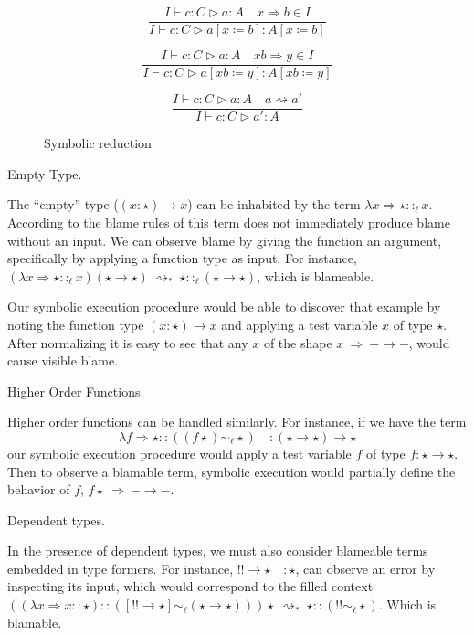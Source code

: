 \begin{figure}
\[
\frac{I\vdash  c:C\vartriangleright a:A\quad x\Rightarrow b\in I}{I\vdash  c:C\vartriangleright a\left[x\coloneqq b\right]:A\left[x\coloneqq b\right]}
\]

\[
\frac{I\vdash  c:C\vartriangleright a:A\quad xb\Rightarrow y\in I}{I\vdash  c:C\vartriangleright a\left[xb\coloneqq y\right]:A\left[xb\coloneqq y\right]}
\]

\[
\frac{I\vdash  c:C\vartriangleright a:A\quad a\rightsquigarrow a'}{I\vdash  c:C\vartriangleright a':A}
\]
\caption{Symbolic reduction}
\label{fig:sym-env-Sym-red}
\end{figure}
 
 
\begin{example} Empty Type.

The ``empty'' type ($\left(x:\star\right)\rightarrow x$) can be inhabited by the \clang{} term $\lambda x\Rightarrow\star::_{\ell }x$.
According to the blame rules of  this term does not immediately produce blame without an input.
We can observe blame by giving the function an argument, specifically by applying a function type as input.
For instance, $(\lambda x\Rightarrow\star::_{\ell }x)(\star\rightarrow\star)\ \rightsquigarrow_{*}\ \star::_{\ell }(\star\rightarrow\star)$, which is blameable.

Our symbolic execution procedure would be able to discover that example by noting the function type $\left(x:\star\right)\rightarrow x$ and applying a test variable $x$ of type $\star$.
After normalizing it is easy to see that any $x$ of the shape $x\ \Rightarrow\ -\rightarrow-$, would cause visible blame.
\end{example}

\begin{example} Higher Order Functions.

Higher order functions can be handled similarly.
For instance, if we have the \clang{} term
\[
\lambda f\Rightarrow\star::((f\star) \sim_{\ell}\star) \quad : \left(\star\rightarrow\star\right)\rightarrow\star
\]
  our symbolic execution procedure would apply a test variable $f$ of type $f:\star\rightarrow\star$.
Then to observe a blamable term, symbolic execution would partially define the behavior of $f$, $f\star\ \Rightarrow\ -\rightarrow-$.
\end{example}

\begin{example} Dependent types.

In the presence of dependent types, we must also consider blameable terms embedded in type formers.
For instance, $!!\rightarrow\star\quad:\star$, can observe an error by inspecting its input, which would correspond to the filled context
  $\left(\left(\lambda x\Rightarrow x::\star\right)::\left([!!\rightarrow\star] \sim_{\ell} \left(\star\rightarrow\star\right)\right)\right)\star\ \rightsquigarrow_{*}\ \star::(!! \sim_{\ell} \star)$.
Which is blamable. %
\end{example}

